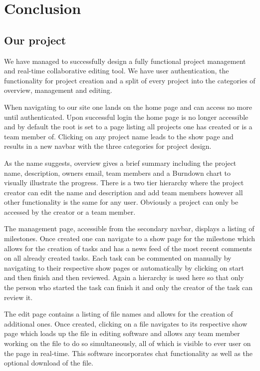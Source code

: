 \documentclass[a4wide, 11pt]{article}
\begin{document}
\clearpage

\section{Conclusion}

\subsection{Our project}
We have managed to successfully design a fully functional project management and real-time collaborative editing tool. We have user authentication, the functionality for project creation and a  split of every project into the categories of overview, management and editing. 

When navigating to our site one lands on the home page and can access no more until authenticated. Upon successful login the home page is no longer accessible and by default the root is set to a page listing all projects one has created or is a team member of. Clicking on any project name leads to the show page and results in a new navbar with the three categories for project design.

As the name suggests, overview gives a brief summary including the project name, description, owners email, team members and a Burndown chart to visually illustrate the progress. There is a two tier hierarchy where the project creator can edit the name and description and add team members however all other functionality is the same for any user. Obviously a project can only be accessed by the creator or a team member. 

The management page, accessible from the secondary navbar, displays a listing of milestones. Once created one can navigate to a show page for the milestone which allows for the creation of tasks and has a news feed of the most recent comments on all already created tasks. Each task can be commented on manually by navigating to their respective show pages or automatically by clicking on start and then finish and then reviewed. Again a hierarchy is used here so that only the person who started the task can finish it and only the creator of the task can review it.

The edit page contains a listing of file names and allows for the creation of additional ones. Once created, clicking on a file navigates to its respective show page which loads up the file in editing software and allows any team member working on the file to do so simultaneously, all of which is visible to ever user on the page in real-time. This software incorporates chat functionality as well as the optional download of the file. 
\end{document}
